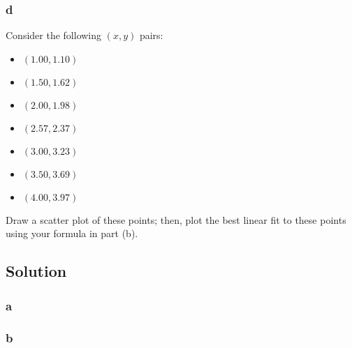 \documentclass[11pt]{report}
\theoremstyle{definition}
\begin{document}
\subsubsection*{d}
Consider the following $(x,y)$ pairs:
\begin{itemize}[itemsep=0pt]
	\item $(1.00, 1.10)$
	\item $(1.50, 1.62)$
	\item $(2.00, 1.98)$
	\item $(2.57, 2.37)$
	\item $(3.00, 3.23)$
	\item $(3.50, 3.69)$
	\item $(4.00, 3.97)$
\end{itemize}
Draw a scatter plot of these points; then, plot the best linear fit to these points using your formula in part (b).

\subsection*{Solution}
\subsubsection*{a}
\subsubsection*{b}


\end{document}
